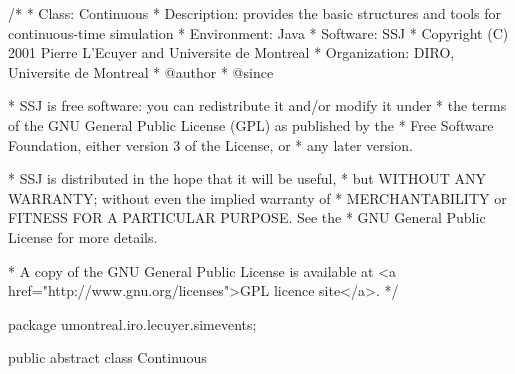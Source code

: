 \begin{code}
\begin{hide}
/*
 * Class:        Continuous
 * Description:  provides the basic structures and tools for 
                 continuous-time simulation
 * Environment:  Java
 * Software:     SSJ 
 * Copyright (C) 2001  Pierre L'Ecuyer and Universite de Montreal
 * Organization: DIRO, Universite de Montreal
 * @author       
 * @since

 * SSJ is free software: you can redistribute it and/or modify it under
 * the terms of the GNU General Public License (GPL) as published by the
 * Free Software Foundation, either version 3 of the License, or
 * any later version.

 * SSJ is distributed in the hope that it will be useful,
 * but WITHOUT ANY WARRANTY; without even the implied warranty of
 * MERCHANTABILITY or FITNESS FOR A PARTICULAR PURPOSE.  See the
 * GNU General Public License for more details.

 * A copy of the GNU General Public License is available at
   <a href="http://www.gnu.org/licenses">GPL licence site</a>.
 */
\end{hide}
package umontreal.iro.lecuyer.simevents;

public abstract class Continuous \begin{hide} {

   // Private variables:

   boolean active; // This variable is currently being integrated.
   double  value;  // Current value of the variable.
   Event  ev;      // Event to be executed after each integ. step,

   //String name;
   double phi;
   double pi;
   double buffer;
   double sum;

   private Simulator sim;
  
\end{hide}
\end{code}

